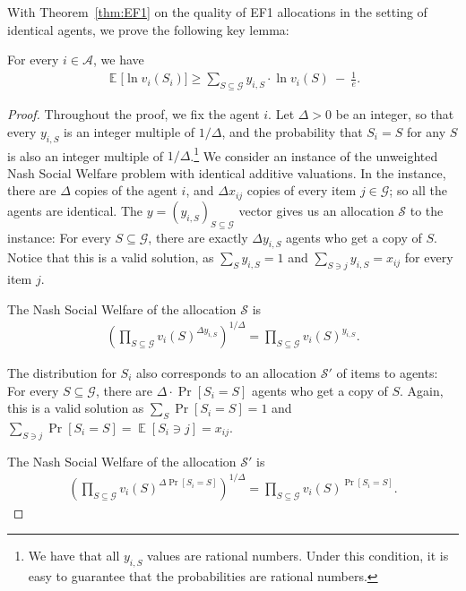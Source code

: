 \documentclass{theoretics}
\newcommand\calS{{\mathcal{S}}}
\newcommand\calA{{\mathcal{A}}}
\newcommand\calG{{\mathcal{G}}}
\DeclareMathOperator{\E}{\mathbb{E}}
\begin{document}
    With Theorem~\ref{thm:EF1} on the quality of EF1 allocations in the setting of identical agents, we prove the following key lemma:
    \begin{lemma}
        For every $i \in \calA$, we have
        \begin{align*}
            \E\big[\ln v_i(S_i)\big] \geq \sum_{S \subseteq \calG} y_{i, S}\cdot \ln v_i(S) \ -\ \frac1e.
        \end{align*}
    \end{lemma}
    \begin{proof}
        Throughout the proof, we fix the agent $i$. Let $\Delta > 0$ be an integer, so that every $y_{i, S}$ is an integer multiple of $1/\Delta$, and the probability that $S_i = S$ for any $S$ is also an integer multiple of $1/\Delta$.\footnote{We have that all $y_{i, S}$ values are rational numbers. Under this condition, it is  easy to guarantee that the probabilities are rational numbers.} We consider an instance of the unweighted Nash Social Welfare problem with identical additive valuations. In the instance, there are $\Delta$ copies of the agent $i$, and $\Delta x_{ij}$ copies of every item $j \in \calG$; so all the agents are identical. The $y = (y_{i, S})_{S \subseteq \calG}$ vector gives us an allocation $\calS$ to the instance: For every $S \subseteq \calG$, there are exactly $\Delta y_{i,S}$ agents who get a copy of $S$.  Notice that this is a valid solution, as $\sum_{S} y_{i, S} = 1$ and $\sum_{S \ni j} y_{i, S} = x_{ij}$ for every item $j$.
        
        The Nash Social Welfare of the allocation $\calS$ is 
        \begin{align*}
            \left(\prod_{S \subseteq \calG} v_i(S)^{\Delta y_{i, S}}\right)^{1/\Delta}  = \prod_{S \subseteq \calG} v_i(S)^{y_{i, S}}.
        \end{align*}
        
        The distribution for $S_i$ also corresponds to an allocation $\calS'$ of items to agents: For every $S \subseteq \calG$, there are $\Delta \cdot \Pr[S_i = S]$ agents who get a copy of $S$. Again, this is a valid solution as $\sum_{S} \Pr[S_i = S] = 1$ and $\sum_{S \ni j} \Pr[S_i = S] = \E[S_i \ni j] = x_{ij}$.
        
        The Nash Social Welfare of the allocation $\calS'$ is 
        \begin{align*}
            \left(\prod_{S \subseteq \calG} v_i(S)^{\Delta \Pr[S_i = S]}\right)^{1/\Delta} = \prod_{S \subseteq \calG} v_i(S)^{\Pr[S_i = S]}.
        \end{align*}
        

\end{proof}
\end{document}
